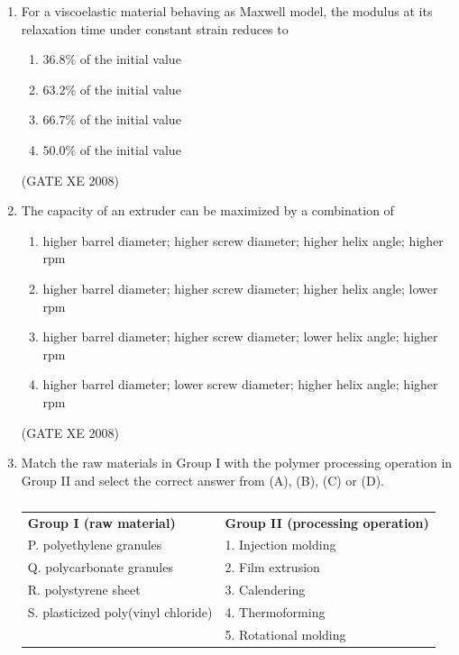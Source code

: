 \documentclass[12pt]{article}
\begin{document}
\begin{enumerate}
\begin{enumerate}
\end{enumerate}

 (GATE XE 2008)

\item For a viscoelastic material behaving as Maxwell model, the modulus at its relaxation time under constant strain reduces to  

\begin{enumerate}
\item  $36.8\%$ of the initial value  
\item  $63.2\%$ of the initial value  
\item  $66.7\%$ of the initial value  
\item  $50.0\%$ of the initial value 
\end{enumerate}

(GATE XE 2008)

\item The capacity of an extruder can be maximized by a combination of  

\begin{enumerate}
\item  higher barrel diameter; higher screw diameter; higher helix angle; higher rpm  
\item  higher barrel diameter; higher screw diameter; higher helix angle; lower rpm 
\item  higher barrel diameter; higher screw diameter; lower helix angle; higher rpm 
\item  higher barrel diameter; lower screw diameter; higher helix angle; higher rpm
\end{enumerate}

(GATE XE 2008)

\item Match the raw materials in Group I with the polymer processing operation in Group II and select the correct answer from (A), (B), (C) or (D).

\begin{table}[H]     \centering     \caption{}     \label{}     \begin{tabular}{l l}
\textbf{Group I (raw material)} & \textbf{Group II (processing operation)} \\
P. polyethylene granules & 1. Injection molding \\
Q. polycarbonate granules & 2. Film extrusion \\
R. polystyrene sheet & 3. Calendering \\
S. plasticized poly(vinyl chloride) & 4. Thermoforming \\
& 5. Rotational molding \\
\end{tabular} \end{table}


\end{enumerate}
\end{document}
